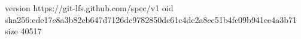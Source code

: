 version https://git-lfs.github.com/spec/v1
oid sha256:ede17e8a3b82eb647d7126dc9782850dc61c4dc2a8ec51b4fc09b941ee4a3b71
size 40517
